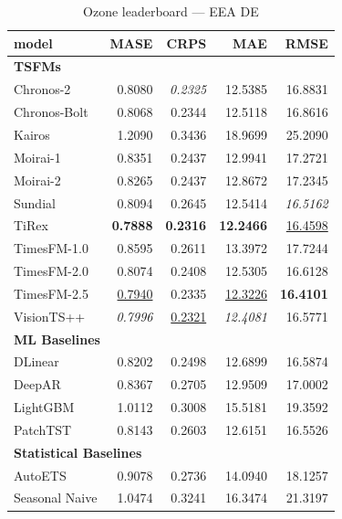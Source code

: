 \begin{table}[H]
\caption{Ozone leaderboard --- EEA DE}
\centering
\begin{small}
\begin{tabular}{lrrrr}
\toprule
model & MASE & CRPS & MAE & RMSE \\
\midrule
\multicolumn{5}{l}{\textbf{TSFMs}} \\
Chronos-2 & 0.8080 & \textit{0.2325} & 12.5385 & 16.8831 \\
Chronos-Bolt & 0.8068 & 0.2344 & 12.5118 & 16.8616 \\
Kairos & 1.2090 & 0.3436 & 18.9699 & 25.2090 \\
Moirai-1 & 0.8351 & 0.2437 & 12.9941 & 17.2721 \\
Moirai-2 & 0.8265 & 0.2437 & 12.8672 & 17.2345 \\
Sundial & 0.8094 & 0.2645 & 12.5414 & \textit{16.5162} \\
TiRex & \textbf{0.7888} & \textbf{0.2316} & \textbf{12.2466} & \underline{16.4598} \\
TimesFM-1.0 & 0.8595 & 0.2611 & 13.3972 & 17.7244 \\
TimesFM-2.0 & 0.8074 & 0.2408 & 12.5305 & 16.6128 \\
TimesFM-2.5 & \underline{0.7940} & 0.2335 & \underline{12.3226} & \textbf{16.4101} \\
VisionTS++ & \textit{0.7996} & \underline{0.2321} & \textit{12.4081} & 16.5771 \\
\midrule
\multicolumn{5}{l}{\textbf{ML Baselines}} \\
DLinear & 0.8202 & 0.2498 & 12.6899 & 16.5874 \\
DeepAR & 0.8367 & 0.2705 & 12.9509 & 17.0002 \\
LightGBM & 1.0112 & 0.3008 & 15.5181 & 19.3592 \\
PatchTST & 0.8143 & 0.2603 & 12.6151 & 16.5526 \\
\midrule
\multicolumn{5}{l}{\textbf{Statistical Baselines}} \\
AutoETS & 0.9078 & 0.2736 & 14.0940 & 18.1257 \\
Seasonal Naive & 1.0474 & 0.3241 & 16.3474 & 21.3197 \\
\bottomrule
\end{tabular}
\end{small}
\end{table}